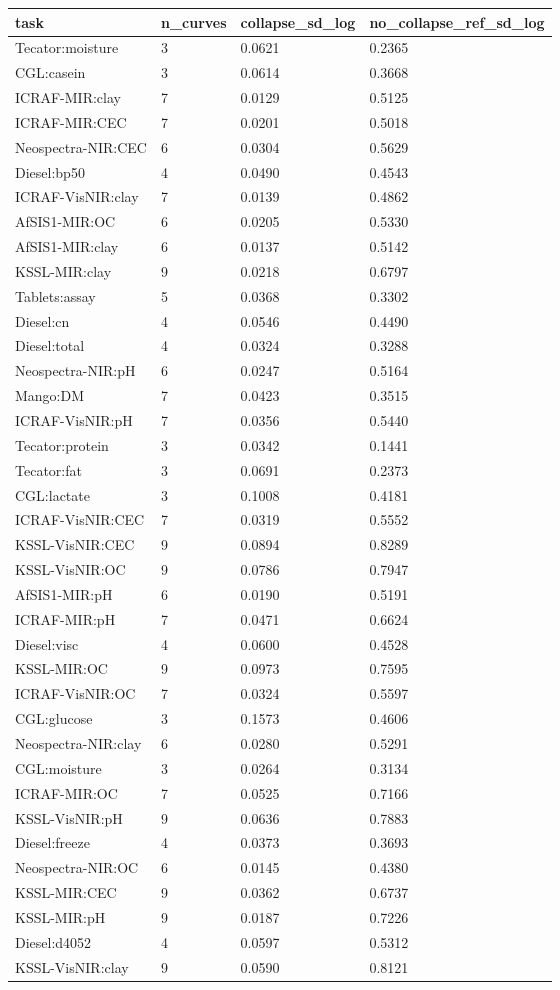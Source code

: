 \begin{tabular}{llll}
\hline
task & n\_curves & collapse\_sd\_log & no\_collapse\_ref\_sd\_log \\
\hline
Tecator:moisture & 3 & 0.0621 & 0.2365 \\
CGL:casein & 3 & 0.0614 & 0.3668 \\
ICRAF-MIR:clay & 7 & 0.0129 & 0.5125 \\
ICRAF-MIR:CEC & 7 & 0.0201 & 0.5018 \\
Neospectra-NIR:CEC & 6 & 0.0304 & 0.5629 \\
Diesel:bp50 & 4 & 0.0490 & 0.4543 \\
ICRAF-VisNIR:clay & 7 & 0.0139 & 0.4862 \\
AfSIS1-MIR:OC & 6 & 0.0205 & 0.5330 \\
AfSIS1-MIR:clay & 6 & 0.0137 & 0.5142 \\
KSSL-MIR:clay & 9 & 0.0218 & 0.6797 \\
Tablets:assay & 5 & 0.0368 & 0.3302 \\
Diesel:cn & 4 & 0.0546 & 0.4490 \\
Diesel:total & 4 & 0.0324 & 0.3288 \\
Neospectra-NIR:pH & 6 & 0.0247 & 0.5164 \\
Mango:DM & 7 & 0.0423 & 0.3515 \\
ICRAF-VisNIR:pH & 7 & 0.0356 & 0.5440 \\
Tecator:protein & 3 & 0.0342 & 0.1441 \\
Tecator:fat & 3 & 0.0691 & 0.2373 \\
CGL:lactate & 3 & 0.1008 & 0.4181 \\
ICRAF-VisNIR:CEC & 7 & 0.0319 & 0.5552 \\
KSSL-VisNIR:CEC & 9 & 0.0894 & 0.8289 \\
KSSL-VisNIR:OC & 9 & 0.0786 & 0.7947 \\
AfSIS1-MIR:pH & 6 & 0.0190 & 0.5191 \\
ICRAF-MIR:pH & 7 & 0.0471 & 0.6624 \\
Diesel:visc & 4 & 0.0600 & 0.4528 \\
KSSL-MIR:OC & 9 & 0.0973 & 0.7595 \\
ICRAF-VisNIR:OC & 7 & 0.0324 & 0.5597 \\
CGL:glucose & 3 & 0.1573 & 0.4606 \\
Neospectra-NIR:clay & 6 & 0.0280 & 0.5291 \\
CGL:moisture & 3 & 0.0264 & 0.3134 \\
ICRAF-MIR:OC & 7 & 0.0525 & 0.7166 \\
KSSL-VisNIR:pH & 9 & 0.0636 & 0.7883 \\
Diesel:freeze & 4 & 0.0373 & 0.3693 \\
Neospectra-NIR:OC & 6 & 0.0145 & 0.4380 \\
KSSL-MIR:CEC & 9 & 0.0362 & 0.6737 \\
KSSL-MIR:pH & 9 & 0.0187 & 0.7226 \\
Diesel:d4052 & 4 & 0.0597 & 0.5312 \\
KSSL-VisNIR:clay & 9 & 0.0590 & 0.8121 \\
\hline
\end{tabular}
